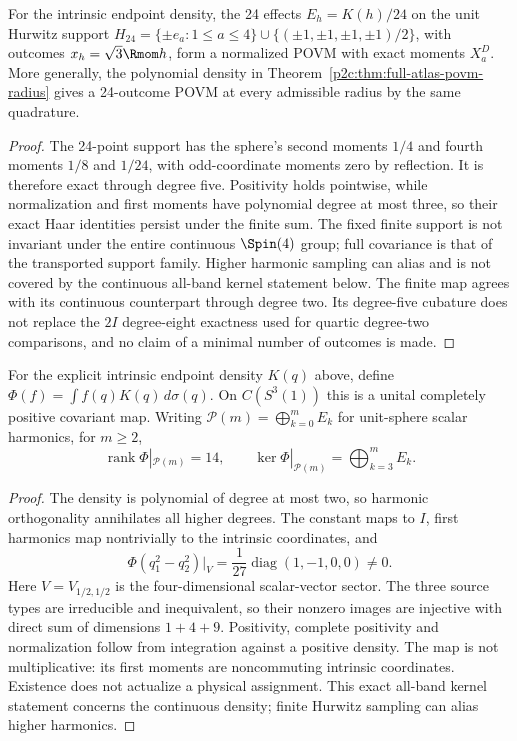 \documentclass[11pt,a4paper]{article}
\begin{document}
\begin{corollary}
\label{p2c:cor:optimal-hurwitz-povm}
For the intrinsic endpoint density, the 24 effects $E_h=K(h)/24$ on the
unit Hurwitz support
$H_{24}=\{\pm e_a:1\le a\le4\}\cup
\{(\pm1,\pm1,\pm1,\pm1)/2\}$, with outcomes $x_h=\sqrt3\Rmom h$, form a normalized
POVM with exact moments $X_a^D$. More generally, the polynomial density in
Theorem~\ref{p2c:thm:full-atlas-povm-radius} gives a 24-outcome POVM at every
admissible radius by the same quadrature.
\end{corollary}
\begin{proof}
The 24-point support has the sphere's second moments $1/4$ and fourth
moments $1/8$ and $1/24$, with odd-coordinate moments zero by reflection.
It is therefore exact through degree five. Positivity holds pointwise, while
normalization and first moments have polynomial degree at most three, so
their exact Haar identities persist under the finite sum.
The fixed finite support is not invariant under the entire continuous
$\Spin(4)$ group; full covariance is that of the transported support family.
Higher harmonic sampling can alias and is not covered by the continuous
all-band kernel statement below. The finite map agrees with its continuous
counterpart through degree two. Its degree-five cubature does not replace
the $2I$ degree-eight exactness used for quartic degree-two comparisons,
and no claim of a minimal number of outcomes is made.
\end{proof}

\begin{corollary}
\label{p2c:cor:optimal-povm-harmonic-kernel}
For the explicit intrinsic endpoint density $K(q)$ above, define
$\Phi(f)=\int f(q)K(q)\,d\sigma(q)$.
On $C(S^3(1))$ this is a unital completely positive covariant map.
Writing $\mathcal P(m)=\bigoplus_{k=0}^mE_k$ for unit-sphere scalar
harmonics, for $m\ge2$,
\[
 \operatorname{rank}\Phi|_{\mathcal P(m)}=14,\qquad
 \ker\Phi|_{\mathcal P(m)}=\bigoplus_{k=3}^m E_k.
\]
\end{corollary}
\begin{proof}
The density is polynomial of degree at most two, so harmonic orthogonality
annihilates all higher degrees. The constant maps to $I$, first harmonics
map nontrivially to the intrinsic coordinates, and
\[
 \Phi(q_1^2-q_2^2)|_V
       =\frac1{27}\operatorname{diag}(1,-1,0,0)\ne0.
\]
Here $V=V_{1/2,1/2}$ is the four-dimensional scalar-vector sector.
The three source types are irreducible and inequivalent, so their nonzero
images are injective with direct sum of dimensions $1+4+9$.
Positivity, complete positivity and normalization follow from integration
against a positive density. The map is not multiplicative: its first moments are noncommuting
intrinsic coordinates. Existence does not actualize a physical assignment.
This exact all-band kernel statement concerns the continuous density;
finite Hurwitz sampling can alias higher harmonics.
\end{proof}
\end{document}
